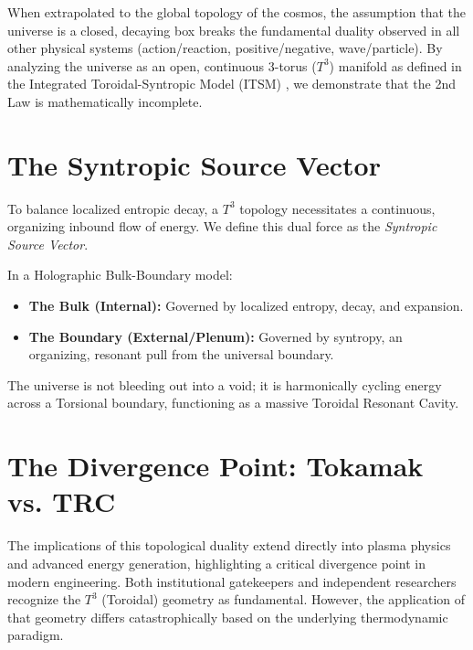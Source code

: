 \documentclass[aps,prd,11pt,onecolumn,superscriptaddress,nofootinbib,floatfix]{revtex4-2}
\begin{document}
When extrapolated to the global topology of the cosmos, the assumption that the universe is a closed, decaying box breaks the fundamental duality observed in all other physical systems (action/reaction, positive/negative, wave/particle). By analyzing the universe as an open, continuous 3-torus ($T^3$) manifold as defined in the Integrated Toroidal-Syntropic Model (ITSM) \cite{itsm_main}, we demonstrate that the 2nd Law is mathematically incomplete.

\section{The Syntropic Source Vector}
\label{sec:syntropy}

To balance localized entropic decay, a $T^3$ topology necessitates a continuous, organizing inbound flow of energy. We define this dual force as the \textit{Syntropic Source Vector}. 

In a Holographic Bulk-Boundary model:
\begin{itemize}
    \item \textbf{The Bulk (Internal):} Governed by localized entropy, decay, and expansion.
    \item \textbf{The Boundary (External/Plenum):} Governed by syntropy, an organizing, resonant pull from the universal boundary.
\end{itemize}

The universe is not bleeding out into a void; it is harmonically cycling energy across a Torsional boundary, functioning as a massive Toroidal Resonant Cavity.

\section{The Divergence Point: Tokamak vs. TRC}
\label{sec:divergence}

The implications of this topological duality extend directly into plasma physics and advanced energy generation, highlighting a critical divergence point in modern engineering. Both institutional gatekeepers and independent researchers recognize the $T^3$ (Toroidal) geometry as fundamental. However, the application of that geometry differs catastrophically based on the underlying thermodynamic paradigm.
\end{document}
